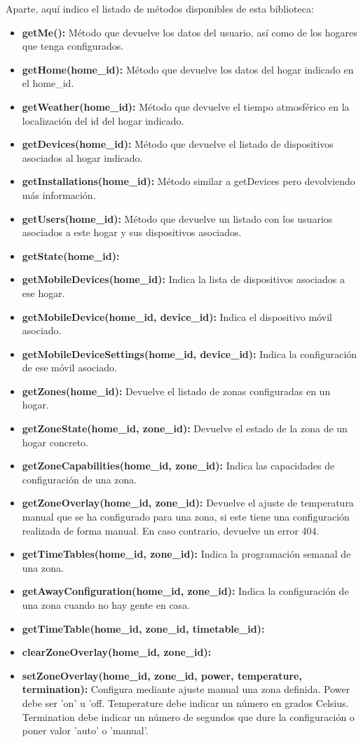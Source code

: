 \documentclass[spanish,12pt, a4paper, twoside]{paper}
\begin{document}
Aparte, aquí indico el listado de métodos disponibles de esta biblioteca:
\begin{itemize}
\item\textbf{getMe():} Método que devuelve los datos del usuario, así como de los hogares que tenga configurados.
\item\textbf{getHome(home\_id):} Método que devuelve los datos del hogar indicado en el home\_id.
\item\textbf{getWeather(home\_id):} Método que devuelve el tiempo atmosférico en la localización del id del hogar indicado.
\item\textbf{getDevices(home\_id):} Método que devuelve el listado de dispositivos asociados al hogar indicado.
\item\textbf{getInstallations(home\_id):} Método similar a getDevices pero devolviendo más información.
\item\textbf{getUsers(home\_id):} Método que devuelve un listado con los usuarios asociados a este hogar y sus dispositivos asociados.
\item\textbf{getState(home\_id):} 
\item\textbf{getMobileDevices(home\_id):} Indica la lista de dispositivos asociados a ese hogar.
\item\textbf{getMobileDevice(home\_id, device\_id):} Indica el dispositivo móvil asociado.
\item\textbf{getMobileDeviceSettings(home\_id, device\_id):} Indica la configuración de ese móvil asociado.
\item\textbf{getZones(home\_id):} Devuelve el listado de zonas configuradas en un hogar.
\item\textbf{getZoneState(home\_id, zone\_id):} Devuelve el estado de la zona de un hogar concreto. 
\item\textbf{getZoneCapabilities(home\_id, zone\_id):} Indica las capacidades de configuración de una zona.
\item\textbf{getZoneOverlay(home\_id, zone\_id):} Devuelve el ajuste de temperatura manual que se ha configurado para una zona, si este tiene una configuración realizada de forma manual. En caso contrario, devuelve un error 404.
\item\textbf{getTimeTables(home\_id, zone\_id):} Indica la programación semanal de una zona.
\item\textbf{getAwayConfiguration(home\_id, zone\_id):} Indica la configuración de una zona cuando no hay gente en casa.
\item\textbf{getTimeTable(home\_id, zone\_id, timetable\_id):}
\item\textbf{clearZoneOverlay(home\_id, zone\_id):}
\item\textbf{setZoneOverlay(home\_id, zone\_id, power, temperature, termination):} Configura mediante ajuste manual una zona definida. 
Power debe ser 'on' u 'off.
Temperature debe indicar un número en grados Celsius.
Termination debe indicar un número de segundos que dure la configuración o poner valor 'auto' o 'manual'.


\end{itemize}
\end{document}
